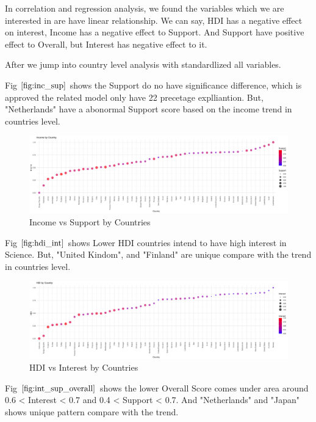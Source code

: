 \documentclass[12pt]{article}
\begin{document}

In correlation and regression analysis, we found the variables which we are interested in are have linear relationship.
We can say, HDI has a negative effect on interest, Income has a negative effect to Support.
And Support have positive effect to Overall, but Interest has negative effect to it.

After we jump into country level analysis with standardlized all variables. 

Fig $\ref{fig:inc_sup}$ shows the Support do no have significance difference, which is approved the related model only have 22 precetage explliantion.
But, "Netherlands" have a abonormal Support score based on the income trend in countries level.


\begin{figure}[htb]
  \centering
  \includegraphics[width=\linewidth]{images/income_support_by_country}
  \caption{Income vs Support by Countries}
  \label{fig:inc_sup}
\end{figure}


Fig $\ref{fig:hdi_int}$ shows Lower HDI countries intend to have high interest in Science.
But, "United Kindom", and "Finland" are unique compare with the trend in countries level.

\begin{figure}[htb]
  \centering
  \includegraphics[width=\linewidth]{images/hdi_interest_by_country}
  \caption{HDI vs Interest by Countries}
  \label{fig:hdi_int}
\end{figure}

Fig $\ref{fig:int_sup_overall}$ shows the lower Overall Score comes under area around 0.6 < Interest  < 0.7 and 0.4 < Support < 0.7.
And "Netherlands" and "Japan" shows unique pattern compare with the trend.
\end{document}
